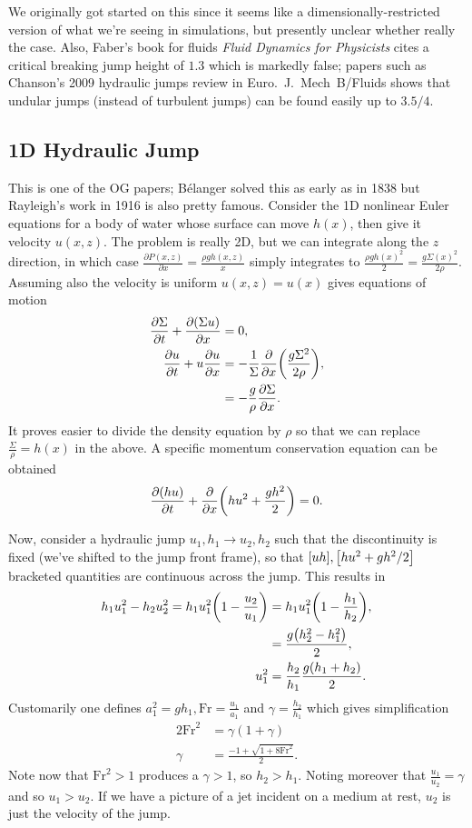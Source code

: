 \documentclass[11pt,
        usenames, %
        dvipsnames %
    ]{report}
\newcommand*{\pd}[2]{\frac{\partial#1}{\partial#2}}
\DeclarePairedDelimiter\p{\lparen}{\rparen}
\DeclarePairedDelimiter\s{\lbrack}{\rbrack}
\begin{document}
We originally got started on this since it seems like a dimensionally-restricted
version of what we're seeing in simulations, but presently unclear whether
really the case. Also, Faber's book for fluids \emph{Fluid Dynamics for
Physicists} cites a critical breaking jump height of $1.3$ which is markedly
false; papers such as Chanson's 2009 hydraulic jumps review in Euro.\ J.\ Mech\
B/Fluids shows that undular jumps (instead of turbulent jumps) can be found
easily up to $3.5/4$.

\subsection{1D Hydraulic Jump}

This is one of the OG papers; B\'elanger solved this as early as in 1838 but
Rayleigh's work in 1916 is also pretty famous. Consider the 1D nonlinear Euler
equations for a body of water whose surface can move $h(x)$, then give it
velocity $u(x, z)$. The problem is really 2D, but we can integrate along the $z$
direction, in which case $\pd{P(x, z)}{x} = \frac{\rho g h(x, z)}{x}$ simply
integrates to $\frac{\rho g h(x)^2}{2} = \frac{g\Sigma(x)^2}{2\rho}$. Assuming
also the velocity is uniform $u(x, z) = u(x)$ gives equations of motion
\begin{align}
    \pd{\Sigma}{t} + \pd{(\Sigma u)}{x} &= 0,\\
    \pd{u}{t} + u\pd{u}{x} &=
        -\frac{1}{\Sigma}\pd{}{x}\p*{\frac{g\Sigma^2}{2\rho}},\nonumber\\
        &= -\frac{g}{\rho}\pd{\Sigma}{x}.
\end{align}
It proves easier to divide the density equation by $\rho$ so that we can replace
$\frac{\Sigma}{\rho} = h(x)$ in the above. A specific momentum conservation
equation can be obtained
\begin{equation}
    \pd{(hu)}{t} + \pd{}{x}\p*{hu^2 + \frac{gh^2}{2}} = 0.
\end{equation}

Now, consider a hydraulic jump $u_1, h_1 \to u_2, h_2$ such that the
discontinuity is fixed (we've shifted to the jump front frame), so that
$\s*{uh}, \s*{hu^2 + gh^2/2}$ bracketed quantities are continuous across the jump.
This results in
\begin{align}
    h_1u_1^2 - h_2u_2^2 = h_1u_1^2\p*{1 - \frac{u_2}{u_1}}
        &= h_1u_1^2\p*{1 - \frac{h_1}{h_2}},\nonumber\\
        &= \frac{g\p*{h_2^2 - h_1^2}}{2},\nonumber\\
    u_1^2 &= \frac{h_2}{h_1}\frac{g\p*{h_1 + h_2}}{2}.
\end{align}
Customarily one defines $a_1^2 = gh_1, \mathrm{Fr} =
\frac{u_1}{a_1}$ and $\gamma = \frac{h_2}{h_1}$ which gives simplification
\begin{align}
    2\mathrm{Fr}^2 &= \gamma(1 + \gamma)\nonumber\\
    \gamma &= \frac{-1 + \sqrt{1 + 8\mathrm{Fr}^2}}{2}.
\end{align}
Note now that $\mathrm{Fr}^2 > 1$ produces a $\gamma > 1$, so $h_2 > h_1$.
Noting moreover that $\frac{u_1}{u_2} = \gamma$ and so $u_1 > u_2$. If we have a
picture of a jet incident on a medium at rest, $u_2$ is just the velocity of the
jump.
\end{document}
